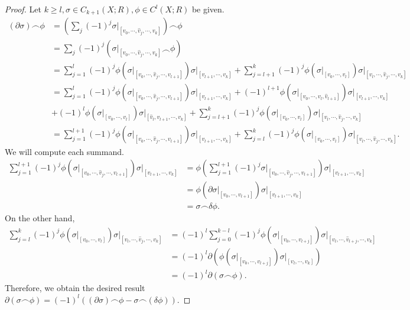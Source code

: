 \documentclass[psamsfonts]{amsart}
\theoremstyle{definition}
\theoremstyle{rem}
\numberwithin{equation}{section}
\begin{document}
\begin{proof}
  Let $k \geq l, \sigma \in C_{k + 1}(X; R), \phi \in C^l(X; R)$ be given.
  \begin{align*}
    (\partial \sigma) \frown \phi
      &= (\sum_{j} (-1)^j \sigma\vert_{[v_0, \cdots, \hat{v}_j, \cdots, v_k]}) \frown \phi \\
      &= \sum_{j} (-1)^j (\sigma\vert_{[v_0, \cdots, \hat{v}_j, \cdots, v_k]} \frown \phi) \\
      &= \sum_{j = 1}^l (-1)^j \phi(\sigma\vert_{[v_0, \cdots, \hat{v}_j, \cdots, v_{l + 1}]})\sigma\vert_{[v_{l + 1}, \cdots, v_k]}
         + \sum_{j = l + 1}^{k} (-1)^j \phi(\sigma\vert_{[v_0, \cdots, v_{l}]})\sigma\vert_{[v_l, \cdots, \hat{v}_j, \cdots, v_k]} \\
      &= \sum_{j = 1}^l (-1)^j \phi(\sigma\vert_{[v_0, \cdots, \hat{v}_j, \cdots, v_{l + 1}]})\sigma\vert_{[v_{l + 1}, \cdots, v_k]} 
         + (-1)^{l + 1}\phi(\sigma\vert_{[v_0, \cdots, v_l, \hat{v}_{l + 1}]})\sigma\vert_{[v_{l + 1}, \cdots, v_k]} \\
      &+ (-1)^{l}\phi(\sigma\vert_{[v_0, \cdots, v_l]})\sigma\vert_{[\hat{v}_l, v_{l + 1}, \cdots, v_k]}
         + \sum_{j = l + 1}^{k} (-1)^j \phi(\sigma\vert_{[v_0, \cdots, v_{l}]})\sigma\vert_{[v_l, \cdots, \hat{v}_j, \cdots, v_k]} \\
      &= \sum_{j = 1}^{l + 1} (-1)^j \phi(\sigma\vert_{[v_0, \cdots, \hat{v}_j, \cdots, v_{l + 1}]})\sigma\vert_{[v_{l + 1}, \cdots, v_k]} 
         + \sum_{j = l}^{k} (-1)^j \phi(\sigma\vert_{[v_0, \cdots, v_{l}]})\sigma\vert_{[v_l, \cdots, \hat{v}_j, \cdots, v_k]}.
  \end{align*}
  We will compute each summand.
  \begin{align*}
    \sum_{j = 1}^{l + 1} (-1)^j \phi(\sigma\vert_{[v_0, \cdots, \hat{v}_j, \cdots, v_{l + 1}]})\sigma\vert_{[v_{l + 1}, \cdots, v_k]} 
      &= \phi(\sum_{j = 1}^{l + 1} (-1)^j \sigma\vert_{[v_0, \cdots, \hat{v}_j, \cdots, v_{l + 1}]})\sigma\vert_{[v_{l + 1}, \cdots, v_k]} \\
      &= \phi(\partial \sigma\vert_{[v_0, \cdots, v_{l + 1}]})\sigma\vert_{[v_{l + 1}, \cdots, v_k]} \\
      &= \sigma \frown \delta\phi.
  \end{align*}
  On the other hand,
  \begin{align*}
    \sum_{j = l}^{k} (-1)^j \phi(\sigma\vert_{[v_0, \cdots, v_{l}]})\sigma\vert_{[v_l, \cdots, \hat{v}_j, \cdots, v_k]}
      &= (-1)^l \sum_{j = 0}^{k - l} (-1)^j \phi(\sigma\vert_{[v_0, \cdots, v_{l + j}]})\sigma\vert_{[v_l, \cdots, \hat{v}_{l + j}, \cdots, v_k]} \\
      &= (-1)^l \partial(\phi(\sigma\vert_{[v_0, \cdots, v_{l + j}]})\sigma\vert_{[v_l, \cdots, v_k]}) \\
      &= (-1)^l \partial(\sigma \frown \phi).
  \end{align*}
  Therefore, we obtain the desired result $\partial (\sigma \frown \phi) = (-1)^l((\partial \sigma) \frown \phi - \sigma \frown (\delta \phi))$.
\end{proof}
\end{document}
